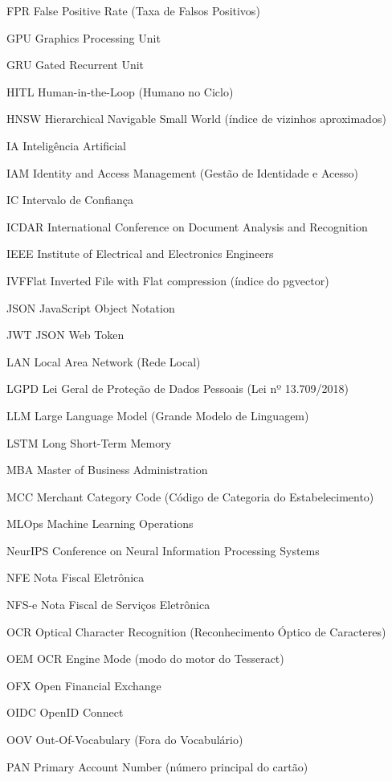 \begin{siglas}
	\item[FPR] False Positive Rate (Taxa de Falsos Positivos)
	\item[GPU] Graphics Processing Unit
	\item[GRU] Gated Recurrent Unit
	\item[HITL] Human-in-the-Loop (Humano no Ciclo)
	\item[HNSW] Hierarchical Navigable Small World (índice de vizinhos aproximados)
	\item[IA] Inteligência Artificial
	\item[IAM] Identity and Access Management (Gestão de Identidade e Acesso)
	\item[IC] Intervalo de Confiança
	\item[ICDAR] International Conference on Document Analysis and Recognition
	\item[IEEE] Institute of Electrical and Electronics Engineers
	\item[IVFFlat] Inverted File with Flat compression (índice do pgvector)
	\item[JSON] JavaScript Object Notation
	\item[JWT] JSON Web Token
	\item[LAN] Local Area Network (Rede Local)
	\item[LGPD] Lei Geral de Proteção de Dados Pessoais (Lei nº 13.709/2018)
	\item[LLM] Large Language Model (Grande Modelo de Linguagem)
	\item[LSTM] Long Short-Term Memory
	\item[MBA] Master of Business Administration
	\item[MCC] Merchant Category Code (Código de Categoria do Estabelecimento)
	\item[MLOps] Machine Learning Operations
	\item[NeurIPS] Conference on Neural Information Processing Systems
	\item[NFE] Nota Fiscal Eletrônica
	\item[NFS-e] Nota Fiscal de Serviços Eletrônica
	\item[OCR] Optical Character Recognition (Reconhecimento Óptico de Caracteres)
	\item[OEM] OCR Engine Mode (modo do motor do Tesseract)
	\item[OFX] Open Financial Exchange
	\item[OIDC] OpenID Connect
	\item[OOV] Out-Of-Vocabulary (Fora do Vocabulário)
	\item[PAN] Primary Account Number (número principal do cartão)

\end{siglas}
